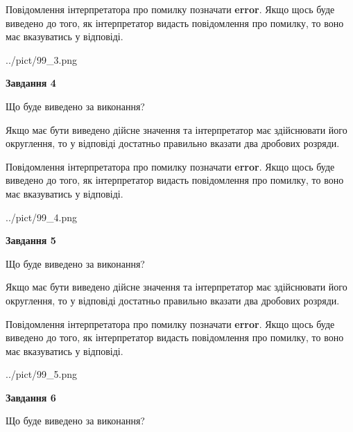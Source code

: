 \documentclass[12pt, ukrainian]{article}
\begin{document}
{\begin {Large}
Повідомлення інтерпретатора про помилку позначати \textbf{error}.
Якщо щось буде виведено до того, як інтерпретатор видасть повідомлення про помилку, 
то воно має вказуватись у відповіді. \par

\begin{center}
	{../pict/99_3.png}
\end{center}
\newpage

{\begin {center}\textbf{Завдання 4}\end {center}}\par
Що буде виведено за виконання? \par

Якщо має бути виведено дійсне значення та інтерпретатор має здійснювати його округлення, 
то у відповіді достатньо правильно вказати два дробових розряди.

Повідомлення інтерпретатора про помилку позначати \textbf{error}.
Якщо щось буде виведено до того, як інтерпретатор видасть повідомлення про помилку, 
то воно має вказуватись у відповіді. \par

\begin{center}
	{../pict/99_4.png}
\end{center}
\newpage

{\begin {center}\textbf{Завдання 5}\end {center}}\par
Що буде виведено за виконання? \par

Якщо має бути виведено дійсне значення та інтерпретатор має здійснювати його округлення, 
то у відповіді достатньо правильно вказати два дробових розряди.

Повідомлення інтерпретатора про помилку позначати \textbf{error}.
Якщо щось буде виведено до того, як інтерпретатор видасть повідомлення про помилку, 
то воно має вказуватись у відповіді. \par

\begin{center}
	{../pict/99_5.png}
\end{center}
\newpage

{\begin {center}\textbf{Завдання 6}\end {center}}\par
Що буде виведено за виконання? \par


\end{Large}}
\end{document}
